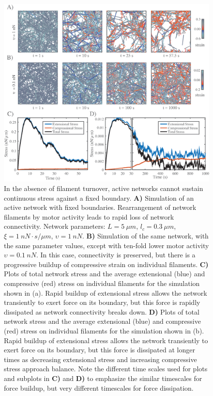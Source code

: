 \begin{figure}[H]
	\centering
	\includegraphics[width=\hsize]{active/figures/Fig6}
	\caption{\label{fig:active_str} In the absence of filament turnover, active networks cannot sustain continuous stress against a fixed boundary.  \textbf{A)} Simulation of an active network with fixed boundaries. Rearrangement of network filaments by motor activity leads to rapid loss of network connectivity.  Network parameters: $L=5\: \mu m$, $l_c=0.3\: \mu m$, $\xi=1\: nN\cdot s/\mu m$, $\upsilon=1\: nN$.  \textbf{B)} Simulation of the same network, with the same parameter values, except with ten-fold lower motor activity $\upsilon=0.1\: nN$. In this case, connectivity is preserved, but there is a progressive buildup of compressive strain on individual filaments.  \textbf{C)} Plots of total network stress and the average extensional (blue) and compressive (red) stress on individual filaments for the simulation shown in (a). Rapid buildup of extensional stress allows the network transiently to exert force on its boundary, but this force is rapidly dissipated as network connectivity breaks down.  \textbf{D)} Plots of total network stress and the average extensional (blue) and compressive (red) stress on individual filaments for the simulation shown in (b). Rapid buildup of extensional stress allows the network transiently to exert force on its boundary, but this force is dissipated at longer times as decreasing extensional stress and increasing compressive stress approach balance.  Note the different time scales used for plots and subplots in \textbf{C)} and \textbf{D)} to emphasize the similar timescales for force buildup, but very different timescales for force dissipation.}
\end{figure}

